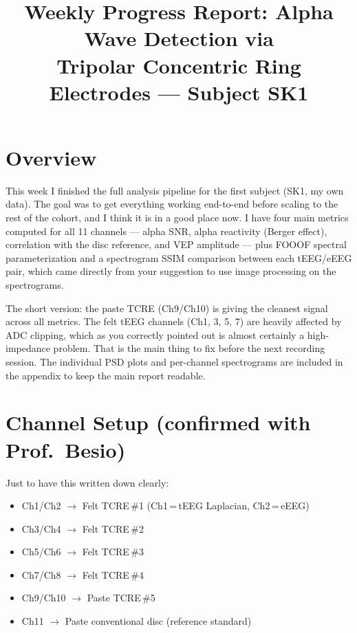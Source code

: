 \documentclass[10pt,conference]{IEEEtran}
\begin{document}
\title{Weekly Progress Report: Alpha Wave Detection via\\
Tripolar Concentric Ring Electrodes --- Subject SK1}

\author{%
  }

\maketitle

\section{Overview}

This week I finished the full analysis pipeline for the first subject
(SK1, my own data).
The goal was to get everything working end-to-end before scaling to the rest
of the cohort, and I think it is in a good place now.
I have four main metrics computed for all 11 channels --- alpha SNR, alpha
reactivity (Berger effect), correlation with the disc reference, and VEP
amplitude --- plus FOOOF spectral parameterization and a spectrogram SSIM
comparison between each tEEG/eEEG pair, which came directly from your
suggestion to use image processing on the spectrograms.

The short version: the paste TCRE (Ch9/Ch10) is giving the cleanest signal
across all metrics.
The felt tEEG channels (Ch1, 3, 5, 7) are heavily affected by ADC clipping,
which as you correctly pointed out is almost certainly a high-impedance
problem.
That is the main thing to fix before the next recording session.
The individual PSD plots and per-channel spectrograms are included in the
appendix to keep the main report readable.

\section{Channel Setup (confirmed with Prof.\ Besio)}

Just to have this written down clearly:

\begin{itemize}
  \item Ch1/Ch2 $\to$ Felt TCRE\,\#1 (Ch1\,=\,tEEG Laplacian, Ch2\,=\,eEEG)
  \item Ch3/Ch4 $\to$ Felt TCRE\,\#2
  \item Ch5/Ch6 $\to$ Felt TCRE\,\#3
  \item Ch7/Ch8 $\to$ Felt TCRE\,\#4
  \item Ch9/Ch10 $\to$ Paste TCRE\,\#5
  \item Ch11 $\to$ Paste conventional disc (reference standard)
\end{itemize}
\end{document}
